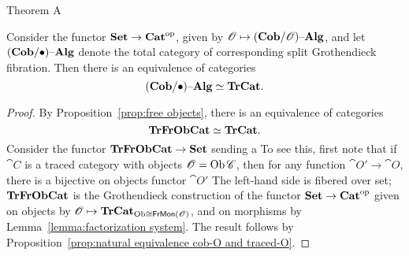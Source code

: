 \documentclass[12pt,oneside,article,draft]{memoir}
\begin{document}
%
%
%
\begin{named}{Theorem A}

Consider the functor $\mathbf{Set}\to{\mathbf{Cat}}^{\text{op}}$, given by $\mathscr{O}\mapsto(\mathbf{Cob}/\mathscr{O}){\text \textendash}\mathbf{Alg}$, and let $(\mathbf{Cob}/\bullet){\text \textendash}\mathbf{Alg}$ denote the total category of corresponding split Grothendieck fibration. Then there is an equivalence of categories
$$(\mathbf{Cob}/\bullet){\text \textendash}\mathbf{Alg}\simeq\mathbf{TrCat}.$$

\end{named}

\begin{proof}

By Proposition~\ref{prop:free objects}, there is an equivalence of categories 
$$\mathbf{TrFrObCat}\simeq\mathbf{TrCat}.$$ 
Consider the functor $\mathbf{TrFrObCat}\to\mathbf{Set}$ sending a  To see this, first note that if $\cat{C}$ is a traced category with objects $\mathscr{O}=\operatorname{Ob}\mathscr{C}$, then for any function $\cat{O'}\to\cat{O}$, there is a bijective on objects functor $\cat{O'}$
The left-hand side is fibered over set; $\mathbf{TrFrObCat}$ is the Grothendieck construction of the functor $\mathbf{Set}\to{\mathbf{Cat}}^{\text{op}}$ given on objects by $\mathscr{O}\mapsto\mathbf{TrCat}_{{\operatorname{Ob}\cong}\mathsf{FrMon}(\mathscr{O})}$, and on morphisms by Lemma~\ref{lemma:factorization system}. The result follows by Proposition~\ref{prop:natural equivalence cob-O and traced-O}. 



\end{proof}
\end{document}
